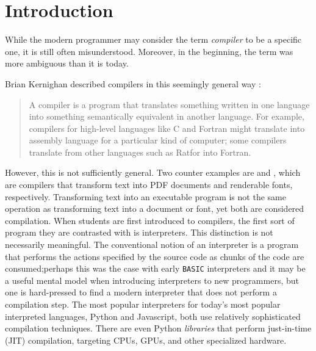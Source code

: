 \chapter{Introduction}
While the modern programmer may consider the term \emph{compiler} to be a specific one, it is still often misunderstood. Moreover, in the beginning, the term was more ambiguous than it is today.

Brian Kernighan described compilers in this seemingly general way
\cite{new-history-of-modern-computing}:

\begin{quotation}
    A compiler is a program that translates something written in one language 
into something semantically equivalent in another language. For example, 
compilers for high-level languages like C and Fortran might translate into 
assembly language for a particular kind of computer; some compilers translate 
from other languages such as Ratfor into Fortran.
\end{quotation}
However, this is not sufficiently general. Two counter examples are \tex and 
\metafont, which are compilers that transform text into PDF documents and 
renderable fonts, respectively. Transforming text into an executable program is 
not the same operation as transforming text into a document or font, yet both 
are considered compilation. When students are first introduced to compilers, the 
first sort of program they are contrasted with is interpreters. This distinction 
is not necessarily meaningful. The conventional notion of an interpreter is a 
program that performs the actions specified by the source code as chunks of the 
code are consumed;perhaps this was the case with early \texttt{BASIC} 
interpreters and it may be a useful mental model when introducing interpreters 
to new programmers, but one is hard-pressed to find a modern interpreter that 
does not perform a compilation step. The most popular interpreters for today's 
most popular interpreted languages, Python and Javascript, both use relatively 
sophisticated compilation techniques. There are even Python \textit{libraries} 
that perform just-in-time (JIT) compilation, targeting CPUs, GPUs, and other 
specialized 
hardware\cite{jax-compiler}\cite{lam-numba}\cite{numba_cuda}\cite{triton-tillet}.


